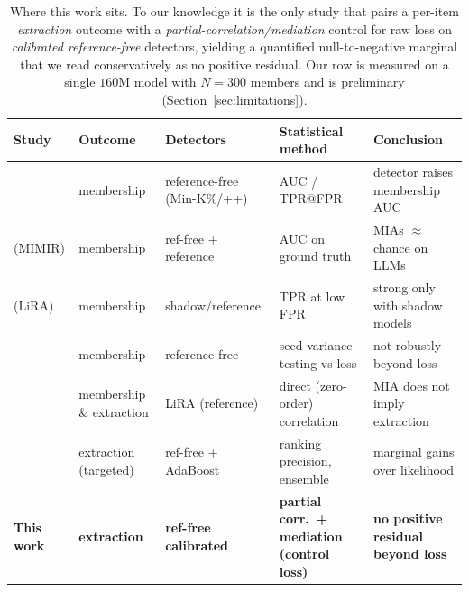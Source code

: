 \begin{table}[t]
\centering
\footnotesize
\begin{tabular}{@{}p{2.1cm}p{1.6cm}p{1.9cm}p{2.0cm}p{2.4cm}@{}}
\toprule
\textbf{Study} & \textbf{Outcome} & \textbf{Detectors} & \textbf{Statistical method} & \textbf{Conclusion} \\
\midrule
\citet{shi2024detecting,zhang2025minkpp} & membership & reference-free (Min-K\%/++) & AUC / TPR@FPR & detector raises membership AUC \\
\citet{duan2024mia} (MIMIR) & membership & ref-free + reference & AUC on ground truth & MIAs $\approx$ chance on LLMs \\
\citet{carlini2022lira} (LiRA) & membership & shadow/reference & TPR at low FPR & strong only with shadow models \\
\citet{chen2025statistical} & membership & reference-free & seed-variance testing vs loss & not robustly beyond loss \\
\citet{hayes2025strong} & membership \& extraction & LiRA (reference) & direct (zero-order) correlation & MIA does not imply extraction \\
\citet{alsahili2025effectiveness} & extraction (targeted) & ref-free + AdaBoost & ranking precision, ensemble & marginal gains over likelihood \\
\textbf{This work} & \textbf{extraction} & \textbf{ref-free calibrated} & \textbf{partial corr.\ + mediation (control loss)} & \textbf{no positive residual beyond loss} \\
\bottomrule
\end{tabular}
\caption{Where this work sits. To our knowledge it is the only study that pairs a per-item
\emph{extraction} outcome with a \emph{partial-correlation/mediation} control for raw loss
on \emph{calibrated reference-free} detectors, yielding a quantified null-to-negative
marginal that we read conservatively as no positive residual. Our row is measured on a
single $160$M model with $N=300$ members and is preliminary
(Section~\ref{sec:limitations}).}
\label{tab:closest}
\end{table}
